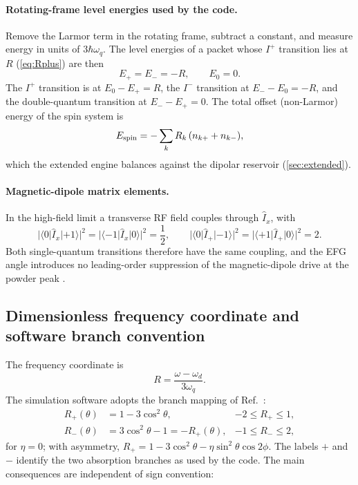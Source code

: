 \documentclass[11pt]{article}
\newcommand{\Iplus}{I^{+}}
\newcommand{\Iminus}{I^{-}}
\begin{document}
\paragraph{Rotating-frame level energies used by the code.}
Remove the Larmor term in the rotating frame, subtract a constant, and measure energy in units
of \(3\hbar\omega_q\). The level energies of a packet whose \(\Iplus\) transition lies at \(R\)
(\cref{eq:Rplus}) are then
\begin{equation}
  E_{+}=E_{-}=-R,\qquad E_0=0 .
  \label{eq:levels-rot}
\end{equation}
The \(\Iplus\) transition is at \(E_0-E_+=R\), the \(\Iminus\) transition at \(E_--E_0=-R\),
and the double-quantum transition at \(E_--E_+=0\). The total offset (non-Larmor) energy of the
spin system is
\begin{equation}
  E_{\rm spin}=-\sum_k R_k\,(n_{k+}+n_{k-}),
  \label{eq:Espin}
\end{equation}
which the extended engine balances against the dipolar reservoir (\cref{sec:extended}).

\paragraph{Magnetic-dipole matrix elements.}
In the high-field limit a transverse RF field couples through \(\hat I_x\), with
\begin{equation}
  |\langle0|\hat I_x|+1\rangle|^2
  =|\langle-1|\hat I_x|0\rangle|^2=\frac12,
  \qquad
  |\langle0|\hat I_+|-1\rangle|^2=|\langle+1|\hat I_+|0\rangle|^2=2 .
  \label{eq:rf-matrix-elements}
\end{equation}
Both single-quantum transitions therefore have the same coupling, and the EFG angle introduces no
leading-order suppression of the magnetic-dipole drive at the powder peak \cite{Abragam1961}.

\subsection{Dimensionless frequency coordinate and software branch convention}

The frequency coordinate is
\begin{equation}
  R = \frac{\omega-\omega_d}{3\omega_q}.
  \label{eq:Rdef}
\end{equation}
The simulation software adopts the branch mapping of Ref.~\cite{ClementKeller2023}:
\begin{align}
  R_{+}(\theta) &= 1-3\cos^2\theta,
  & -2\le R_{+}\le 1,
  \label{eq:Rplus}\\
  R_{-}(\theta) &= 3\cos^2\theta-1=-R_{+}(\theta),
  & -1\le R_{-}\le 2,
  \label{eq:Rminus}
\end{align}
for \(\eta=0\); with asymmetry,
\(R_+=1-3\cos^2\theta-\eta\sin^2\theta\cos2\phi\). The labels \(+\) and \(-\) identify the two
absorption branches as used by the code. The main consequences are independent of sign
convention:
\end{document}
